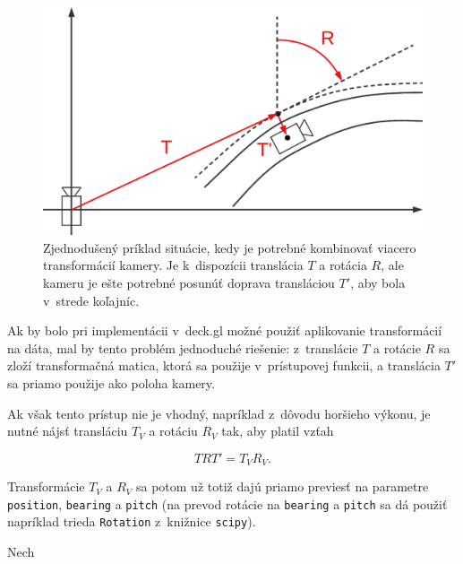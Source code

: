\begin{figure}[h]
    \centering
    \includegraphics[width=0.8\linewidth]{text_prace/obrazky-figures/tri_transformacie.pdf}
    \caption[Kombinácia viacerých transformácií kamery.]{Zjednodušený príklad situácie, kedy je potrebné kombinovať viacero transformácií kamery. Je k~dispozícii translácia $T$ a rotácia $R$, ale kameru je ešte potrebné posunúť doprava transláciou $T'$, aby bola v~strede koľajníc.}
    \label{fig:transformacie_kamery}
\end{figure}

Ak by bolo pri implementácii v~deck.gl možné použiť aplikovanie transformácií na dáta, mal by tento problém jednoduché riešenie: z~translácie $T$ a rotácie $R$ sa zloží transformačná matica, ktorá sa použije v~prístupovej funkcii, a translácia $T'$ sa priamo použije ako poloha kamery.

Ak však tento prístup nie je vhodný, napríklad z~dôvodu horšieho výkonu, je nutné nájsť transláciu $T_V$ a rotáciu $R_V$ tak, aby platil vzťah 

$$ T R T' = T_V R_V \mathrm{.}$$

Transformácie $T_V$ a $R_V$ sa potom už totiž dajú priamo previesť na parametre \texttt{position}, \texttt{bearing} a \texttt{pitch} (na prevod rotácie na \texttt{bearing} a \texttt{pitch} sa dá použiť napríklad trieda \texttt{Rotation} z~knižnice \texttt{scipy}).

Nech

